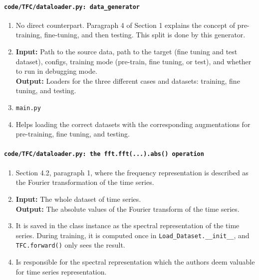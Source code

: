 \documentclass[a4paper,11pt]{article}
\newcommand{\code}[1]{\texttt{#1}}
\begin{document}
\paragraph{\code{code/TFC/dataloader.py: data\_generator}}
\begin{enumerate}[label=(\roman*)]
\item No direct counterpart. Paragraph 4 of Section 1 explains the concept of pre-training, fine-tuning, and then testing. This split is done by this generator. 
\item 
    \textbf{Input:} Path to the source data, path to the target (fine tuning and test dataset), configs, training mode (pre-train, fine tuning, or test), and whether to run in debugging mode.\\
    \textbf{Output:} Loaders for the three different cases and datasets: training, fine tuning, and testing.
\item \texttt{main.py}
\item Helps loading the correct datasets with the corresponding augmentations for pre-training, fine tuning, and testing.
\end{enumerate}

\paragraph{\code{code/TFC/dataloader.py: the \code{fft.fft(...).abs()} operation}}
\begin{enumerate}[label=(\roman*)]
\item Section 4.2, paragraph 1, where the frequency representation is described as the Fourier transformation of the time series.
\item 
    \textbf{Input:} The whole dataset of time series. \\
    \textbf{Output:} The absolute values of the Fourier transform of the time series.
\item It is saved in the class instance as the spectral representation of the time series. During training, it is computed once in \code{Load\_Dataset.\_\_init\_\_}, and \texttt{TFC.forward()} only sees the result.
\item Is responsible for the spectral representation which the authors deem valuable for time series representation.
\end{enumerate}
\end{document}

